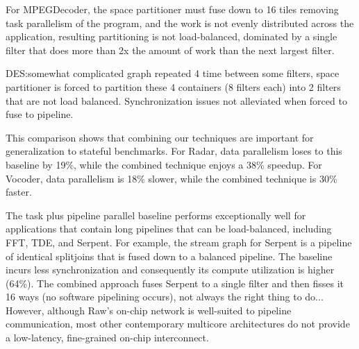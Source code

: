 For MPEGDecoder, the space partitioner must fuse down to 16 tiles removing task
parallelism of the program, and the work is not evenly distributed
across the application, resulting partitioning is not load-balanced,
dominated by a single filter that does more than 2x the amount of work
than the next largest filter.

DES:somewhat complicated graph repeated 4 time between some filters,
space partitioner is forced to partition these 4 containers (8 filters
each) into 2 filters that are not load balanced.  Synchronization
issues not alleviated when forced to fuse to pipeline.

This comparison shows that combining our techniques are important for
generalization to stateful benchmarks.  For Radar, data parallelism
loses to this baseline by 19\%, while the combined technique enjoys a
38\% speedup. For Vocoder, data parallelism is 18\% slower, while the
combined technique is 30\% faster.

The task plus pipeline parallel baseline performs exceptionally well
for applications that contain long pipelines that can be
load-balanced, including FFT, TDE, and Serpent.  For example, the
stream graph for Serpent is a pipeline of identical splitjoins that is
fused down to a balanced pipeline.  The baseline incurs less
synchronization and consequently its compute utilization is higher
(64\%).  The combined approach fuses Serpent to a single filter and
then fisses it 16 ways (no software pipelining occurs), not always the
right thing to do... However, although Raw's on-chip network is
well-suited to pipeline communication, most other contemporary
multicore architectures do not provide a low-latency, fine-grained
on-chip interconnect.




